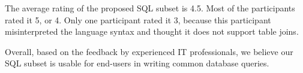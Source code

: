 The average rating of the proposed SQL subset is 4.5. Most of
the participants rated it 5, or 4. Only one participant rated
it 3, because this participant misinterpreted the language
syntax and thought it does not support table joins.

Overall, based on the feedback by experienced IT professionals,
we believe our SQL subset is usable
for end-users in writing common database queries.

